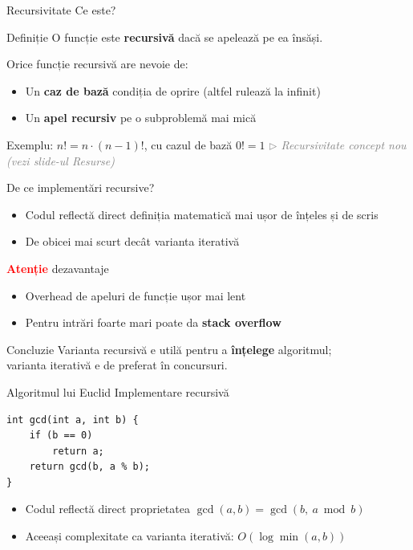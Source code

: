 \documentclass{beamer}
\newcommand{\beginnote}[1]{%
  \vfill
  {\footnotesize\textcolor{gray}{\textit{$\triangleright$ #1 (vezi slide-ul \emph{Resurse})}}}%
}
\begin{document}
\begin{frame}{Recursivitate \textemdash{} Ce este?}
  \begin{block}{Definiție}
    O funcție este \textbf{recursivă} dacă se apelează pe ea însăși.
  \end{block}
  \bigskip
  Orice funcție recursivă are nevoie de:
  \begin{itemize}
    \item Un \textbf{caz de bază} \textemdash{} condiția de oprire (altfel rulează la infinit)
    \item Un \textbf{apel recursiv} pe o subproblemă mai mică
  \end{itemize}
  \bigskip
  Exemplu: $n! = n \cdot (n-1)!$, cu cazul de bază $0! = 1$
  \beginnote{Recursivitate \textemdash{} concept nou}
\end{frame}

\begin{frame}{De ce implementări recursive?}
  \begin{itemize}
    \item Codul reflectă direct definiția matematică \textemdash{} mai ușor de înțeles și de scris
    \item De obicei mai scurt decât varianta iterativă
  \end{itemize}
  \medskip
  \begin{block}{\textbf{\textcolor{red}{Atenție}} \textemdash{} dezavantaje}
    \begin{itemize}
      \item Overhead de apeluri de funcție \textemdash{} ușor mai lent
      \item Pentru intrări foarte mari poate da \textbf{stack overflow}
    \end{itemize}
  \end{block}
  \medskip
  \begin{block}{Concluzie}
    Varianta recursivă e utilă pentru a \textbf{înțelege} algoritmul; \\ varianta iterativă e de preferat în concursuri.
  \end{block}
\end{frame}

\begin{frame}{Algoritmul lui Euclid \textemdash{} Implementare recursivă}
  \begin{center}
  \begin{lstlisting}
int gcd(int a, int b) {
    if (b == 0)
        return a;
    return gcd(b, a % b);
}
  \end{lstlisting}
  \end{center}
  \bigskip
  \begin{itemize}
    \item Codul reflectă direct proprietatea $\gcd(a, b) = \gcd(b,\ a \bmod b)$
    \item Aceeași complexitate ca varianta iterativă: $O(\log \min(a, b))$
  \end{itemize}
\end{frame}
\end{document}
